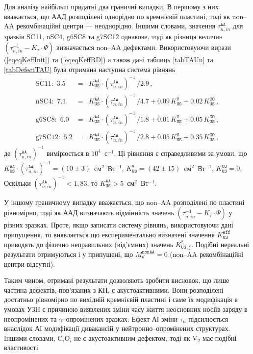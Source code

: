 Для аналізу найбільш придатні два граничні випадки.
В першому з них вважається,
що ААД розподілені однорідно по кремнієвій пластині, тоді як
non--AA рекомбінаційні центри --- неоднорідно.
Іншими словами,
значення $\tau_{n,in}^\mathtt{AA}$ для зразків SC11, nSC4, g6SC8 та g7SC12
однакове, тоді як різниця величин
$(\tau_{n,in}^{-1}-K_\tau\cdot\Psi)$ визначається non--AA дефектами.
Використовуючи вирази (\ref{eqeqKeffInit}) та (\ref{eqeqKeffRD}) а також
дані таблиць \ref{tabTAUn} та \ref{tabDefectTAU}
була отримана наступна система рівнянь
\begin{eqnarray}
\mbox{SC11}:\,\,3.5&=&K_\mathtt{US}^\mathtt{AA}\cdot(\tau_{n,in}^\mathtt{AA})^{-1}\,/2.9\,,\nonumber\\
\mbox{nSC4}:\,\,7.1&=&K_\mathtt{US}^\mathtt{AA}\cdot(\tau_{n,in}^\mathtt{AA})^{-1}\,/4.7+0.09\,K_\mathtt{US}^\mathtt{V}+0.02\,K_\mathtt{US}^\mathtt{CO}\,,\nonumber\\
\mbox{g6SC8}:\,\,6.0&=&K_\mathtt{US}^\mathtt{AA}\cdot(\tau_{n,in}^\mathtt{AA})^{-1}\,/1.8+0.01\,K_\mathtt{US}^\mathtt{V}+0.05\,K_\mathtt{US}^\mathtt{CO}\,,\nonumber\\
\mbox{g7SC12}:\,\,5.2&=&K_\mathtt{US}^\mathtt{AA}\cdot(\tau_{n,in}^\mathtt{AA})^{-1}\,/2.8+0.05\,K_\mathtt{US}^\mathtt{V}+0.35\,K_\mathtt{US}^\mathtt{CO}\,,\nonumber
\end{eqnarray}
де
$(\tau_{n,in}^\mathtt{AA})^{-1}$ вимірюється в $10^4$~с$^{-1}$.
Ці рівняння є справедливими за умови, що
$K_\mathtt{US}^\mathtt{AA}\cdot(\tau_{n,in}^\mathtt{AA})^{-1}=(10\pm3)$~см$^2$~Вт$^{-1}$,
$K_\mathtt{US}^\mathtt{V}=(42\pm15)$~см$^2$~Вт$^{-1}$,
$K_\mathtt{US}^\mathtt{CO}=0$.
Оскільки  $(\tau_{n,in}^\mathtt{AA})^{-1}<1,83$,
то $K_\mathtt{US}^\mathtt{AA}>5$~см$^2$~Вт$^{-1}$.

У іншому граничному випадку вважається,
що non--AA розподілені по пластині рівномірно,
тоді як ААД визначають відмінність значень $(\tau_{n,in}^{-1}-K_\tau\cdot\Psi)$ у різних зразках.
Проте, якщо записати систему рівнянь, використовуючи дані припущення,
то виявляється що експериментально визначені значення $K_\mathtt{US}^\mathtt{eff}$
приводять до фізично неправильних (від'ємних) значень $K_\mathtt{US,j}^*$.
Подібні нереальні результати отримуються і у припущені, що $M_d^\mathtt{nonAA}=0$
(non--AA рекомбінаційні центри відсутні).

Таким чином, отримані результати дозволяють зробити висновок,
що лише частина дефектів, пов'язаних з КП, є акустоактивними.
Вони розподілені достатньо рівномірно по вихідній кремнієвій пластині і саме їх модифікація
в умовах УЗН є причиною виявлених зміни часу життя неосновних носіїв заряду в неопромінених та $\gamma$--опромінених зразках.
Ефект АІ зміни $\tau_n$ підсилюється внаслідок АІ модифікації дивакансій у нейтронно--опромінених структурах.
Іншими словами,
C$_i$O$_i$ не є акустоактивним дефектом, тоді як V$_2$ має подібні властивості.



